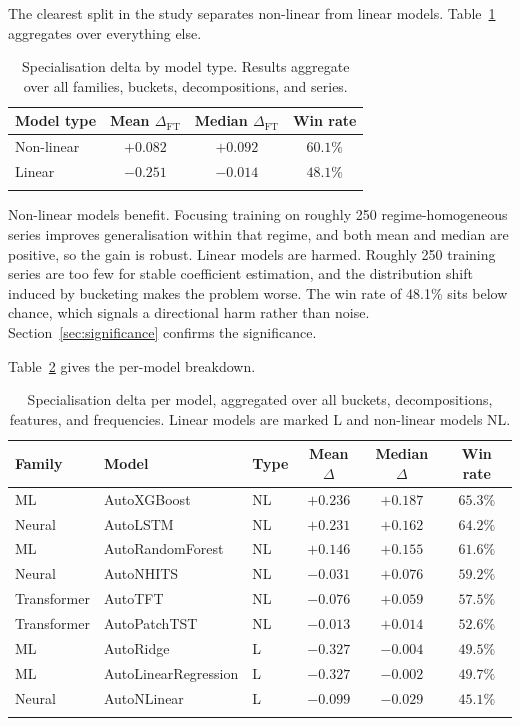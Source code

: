 \documentclass[pdflatex,sn-mathphys-num]{sn-jnl}
\theoremstyle{thmstyleone}
\theoremstyle{thmstyletwo}
\theoremstyle{thmstylethree}
\begin{document}
The clearest split in the study separates non-linear from linear models.
Table~\ref{tab:lin_nonlin} aggregates over everything else.

\begin{table}[ht]
\caption{Specialisation delta by model type. Results aggregate over all
families, buckets, decompositions, and series.}\label{tab:lin_nonlin}
\begin{tabular}{lccc}
\toprule
Model type & Mean $\Delta_{\mathrm{FT}}$ & Median $\Delta_{\mathrm{FT}}$ & Win rate \\
\midrule
Non-linear & $+0.082$ & $+0.092$ & $60.1\%$ \\
Linear     & $-0.251$ & $-0.014$ & $48.1\%$ \\
\botrule
\end{tabular}
\end{table}

Non-linear models benefit. Focusing training on roughly 250 regime-homogeneous
series improves generalisation within that regime, and both mean and median
are positive, so the gain is robust. Linear models are harmed. Roughly 250
training series are too few for stable coefficient estimation, and the
distribution shift induced by bucketing makes the problem worse. The win rate
of 48.1\% sits below chance, which signals a directional harm rather than
noise. Section~\ref{sec:significance} confirms the significance.

Table~\ref{tab:per_model} gives the per-model breakdown.

\begin{table}[ht]
\caption{Specialisation delta per model, aggregated over all buckets,
decompositions, features, and frequencies. Linear models are marked L and
non-linear models NL.}\label{tab:per_model}
\begin{tabular*}{\textwidth}{@{\extracolsep\fill}lllccc}
\toprule
Family & Model & Type & Mean $\Delta$ & Median $\Delta$ & Win rate \\
\midrule
ML          & AutoXGBoost           & NL & $+0.236$ & $+0.187$ & $65.3\%$ \\
Neural      & AutoLSTM              & NL & $+0.231$ & $+0.162$ & $64.2\%$ \\
ML          & AutoRandomForest      & NL & $+0.146$ & $+0.155$ & $61.6\%$ \\
Neural      & AutoNHITS             & NL & $-0.031$ & $+0.076$ & $59.2\%$ \\
Transformer & AutoTFT               & NL & $-0.076$ & $+0.059$ & $57.5\%$ \\
Transformer & AutoPatchTST          & NL & $-0.013$ & $+0.014$ & $52.6\%$ \\
\midrule
ML          & AutoRidge             & L  & $-0.327$ & $-0.004$ & $49.5\%$ \\
ML          & AutoLinearRegression  & L  & $-0.327$ & $-0.002$ & $49.7\%$ \\
Neural      & AutoNLinear           & L  & $-0.099$ & $-0.029$ & $45.1\%$ \\
\botrule
\end{tabular*}
\end{table}
\end{document}

